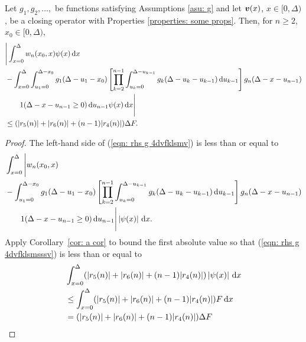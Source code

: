 \begin{cor}
	 Let \(g_1,g_2,\dots,\) be functions satisfying Assumptions \ref{asu: g} and let \({\boldsymbol v}(x)\), \(x\in[0,\Delta)\), be a closing operator with Properties \ref{properties: some props}. Then, for \(n\geq 2\), \(x_0\in[0,\Delta)\), 
	\begin{align}
		&\Bigg| \int_{x=0}^\Delta w_n(x_0,x) \psi(x) \, \mathrm{d} x \nonumber 
		\\&{}- \int_{x=0}^\Delta \int_{u_1=0}^{\Delta-x_0}g_1(\Delta - u_1 - x_0)
		\left[\prod_{k=2}^{n-1} \int_{u_k=0}^{\Delta-u_{k-1}} g_k(\Delta-u_k-u_{k-1})\, \mathrm{d} u_{k-1}\right] \nonumber 
            	g_{n}(\Delta - x-u_{n-1})
	\\&\qquad{} 1(\Delta-x-u_{n-1}\geq0) \, \mathrm{d} u_{n-1}\psi(x) \, \mathrm{d} x \Bigg| \nonumber
		\\&\leq (|r_5(n)| + |r_6(n)| + (n-1)|r_4(n)|)\Delta F. \label{eqn: rhs g 4dvfklsmv}
	\end{align}
\end{cor}
\begin{proof}
	The left-hand side of (\ref{eqn: rhs g 4dvfklsmv}) is less than or equal to 
	\begin{align}
		&\int_{x=0}^\Delta \Bigg| w_n(x_0,x)  \nonumber 
		\\&{}- \int_{u_1=0}^{\Delta-x_0}g_1(\Delta - u_1 - x_0)
		\left[\prod_{k=2}^{n-1} \int_{u_k=0}^{\Delta-u_{k-1}} g_k(\Delta-u_k-u_{k-1})\, \mathrm{d} u_{k-1}\right] \nonumber 
            	g_{n}(\Delta - x-u_{n-1})
	\\&\qquad{} 1(\Delta-x-u_{n-1}\geq0) \, \mathrm{d} u_{n-1}\Bigg| \left|\psi(x)\right| \, \mathrm{d} x. \label{eqn: rhs g 4dvfklsmsssv}
	\end{align}
	Apply Corollary~\ref{cor: a cor} to bound the first absolute value so that (\ref{eqn: rhs g 4dvfklsmsssv}) is less than or equal to 
	\begin{align}
		&\int_{x=0}^\Delta (|r_5(n)| + |r_6(n)| + (n-1)|r_4(n)|) \left|\psi(x)\right| \, \mathrm{d} x \nonumber
		\\&\leq \int_{x=0}^\Delta(|r_5(n)| + |r_6(n)| + (n-1)|r_4(n)|) F \, \mathrm{d} x \nonumber 
		\\&= (|r_5(n)| + |r_6(n)| + (n-1)|r_4(n)|)\Delta F 
	\end{align}
\end{proof}

